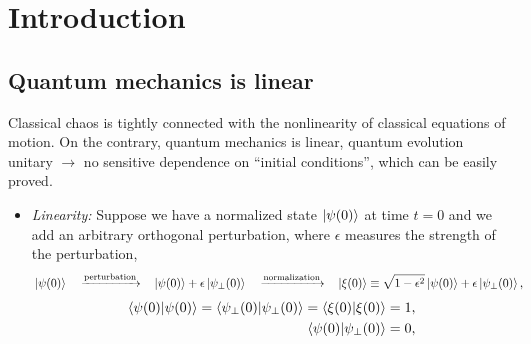 \documentclass[a4paper,11pt,twoside]{article}
\begin{document}
\section{Introduction}
    \subsection{Quantum mechanics is linear}
        Classical chaos is tightly connected with the nonlinearity of classical equations of motion.
        On the contrary, quantum mechanics is linear, quantum evolution unitary $\longrightarrow$ no sensitive dependence on ``initial conditions'', which can be easily proved.
        \begin{itemize}
            \item 
                \emph{Linearity:} Suppose we have a normalized state $\left|{\psi(0)}\right\rangle$ at time $t=0$ and we add an arbitrary orthogonal perturbation, where $\epsilon$ measures the strength of the perturbation,
                \begin{align}
                    &\left|{\psi(0)}\right\rangle
                    &&\xrightarrow{\text{perturbation}}
                    &&\left|{\psi(0)}\right\rangle+\epsilon\left|{\psi_{\perp}(0)}\right\rangle
                    &&\xrightarrow{\text{normalization}}
                    &&\left|{\xi(0)}\right\rangle\equiv\sqrt{1-\epsilon^{2}}\left|{\psi(0)}\right\rangle+\epsilon\left|{\psi_{\perp}(0)}\right\rangle,
                \end{align}
                \begin{align}
                    \left\langle{\psi(0)}\middle|{\psi(0)}\right\rangle=\left\langle{\psi_{\perp}(0)}\middle|{\psi_{\perp}(0)}\right\rangle=\left\langle{\xi(0)}\middle|{\xi(0)}\right\rangle=1,\nonumber\\
                    \label{eq:LinearityOrthogonality0}
                    \left\langle{\psi(0)}\middle|{\psi_{\perp}(0)}\right\rangle=0,                 
                \end{align}
            

\end{itemize}
\end{document}

